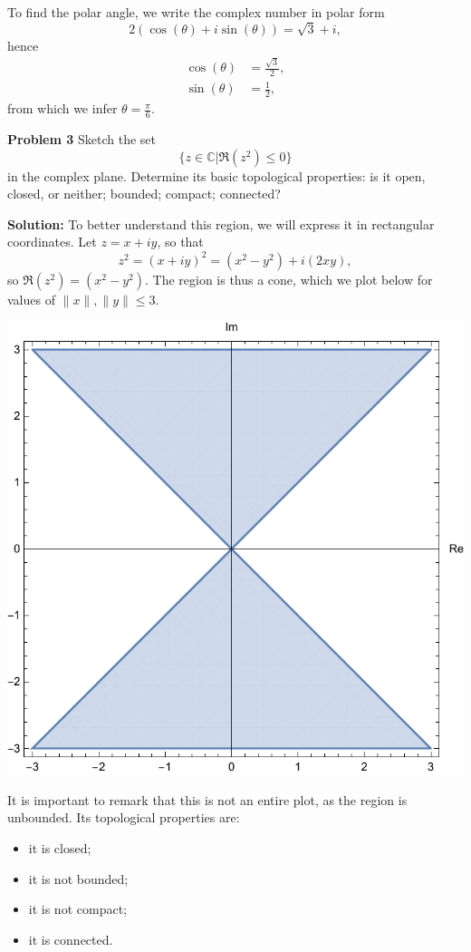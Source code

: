 \documentclass[12pt,oneside]{exam}
\newenvironment{exercise}[1]{\vspace{.1in}\noindent\textbf{Problem #1 \hspace{.05em}}}{}
\newcommand{\C}{\mathbb{C}}
\begin{document}
To find the polar angle, we write the complex number in polar form
\begin{equation*}
2(\cos(\theta)+i\sin(\theta)) = \sqrt{3}+i,
\end{equation*}
hence 
\begin{align*}
\cos(\theta) & = \frac{\sqrt{3}}{2},\\
\sin(\theta) & = \frac{1}{2},
\end{align*}
from which we infer $\theta = \frac{\pi}{6}$. 
\vfill


\begin{exercise}{3}
Sketch the set 
\begin{equation*}
\{z \in \C | \Re(z^2) \leq 0 \}
\end{equation*}
in the complex plane. Determine its basic topological properties: is it open, closed, or neither; bounded; compact; connected?
\end{exercise}

\textbf{Solution:} To better understand this region, we will express it in rectangular coordinates. Let $z=x+iy$, so that 
\begin{equation*}
z^2 = (x+iy)^2 = (x^2-y^2)+i(2xy),
\end{equation*}
so $\Re(z^2) = (x^2-y^2)$. 
The region is thus a cone, which we plot below for values of $\|x\|, \|y\| \leq 3$. 
\begin{center}
\includegraphics[scale=0.5]{p2.pdf} 
\end{center}
It is important to remark that this is not an entire plot, as the region is unbounded. Its topological properties are:
\begin{itemize}
\item it is closed;
\item it is not bounded;
\item it is not compact;
\item it is connected.
\end{itemize}
\vfill 
\end{document}
